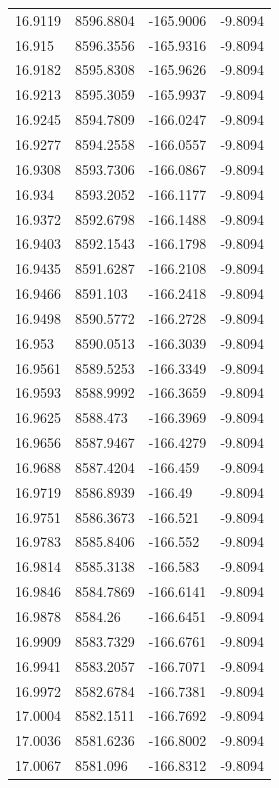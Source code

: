 \begin{table}[H]
\begin{tabular}{llll}
16.9119 & 8596.8804 & -165.9006 & -9.8094 \\
16.915 & 8596.3556 & -165.9316 & -9.8094 \\
16.9182 & 8595.8308 & -165.9626 & -9.8094 \\
16.9213 & 8595.3059 & -165.9937 & -9.8094 \\
16.9245 & 8594.7809 & -166.0247 & -9.8094 \\
16.9277 & 8594.2558 & -166.0557 & -9.8094 \\
16.9308 & 8593.7306 & -166.0867 & -9.8094 \\
16.934 & 8593.2052 & -166.1177 & -9.8094 \\
16.9372 & 8592.6798 & -166.1488 & -9.8094 \\
16.9403 & 8592.1543 & -166.1798 & -9.8094 \\
16.9435 & 8591.6287 & -166.2108 & -9.8094 \\
16.9466 & 8591.103 & -166.2418 & -9.8094 \\
16.9498 & 8590.5772 & -166.2728 & -9.8094 \\
16.953 & 8590.0513 & -166.3039 & -9.8094 \\
16.9561 & 8589.5253 & -166.3349 & -9.8094 \\
16.9593 & 8588.9992 & -166.3659 & -9.8094 \\
16.9625 & 8588.473 & -166.3969 & -9.8094 \\
16.9656 & 8587.9467 & -166.4279 & -9.8094 \\
16.9688 & 8587.4204 & -166.459 & -9.8094 \\
16.9719 & 8586.8939 & -166.49 & -9.8094 \\
16.9751 & 8586.3673 & -166.521 & -9.8094 \\
16.9783 & 8585.8406 & -166.552 & -9.8094 \\
16.9814 & 8585.3138 & -166.583 & -9.8094 \\
16.9846 & 8584.7869 & -166.6141 & -9.8094 \\
16.9878 & 8584.26 & -166.6451 & -9.8094 \\
16.9909 & 8583.7329 & -166.6761 & -9.8094 \\
16.9941 & 8583.2057 & -166.7071 & -9.8094 \\
16.9972 & 8582.6784 & -166.7381 & -9.8094 \\
17.0004 & 8582.1511 & -166.7692 & -9.8094 \\
17.0036 & 8581.6236 & -166.8002 & -9.8094 \\
17.0067 & 8581.096 & -166.8312 & -9.8094 \\

\end{tabular}
\end{table}
